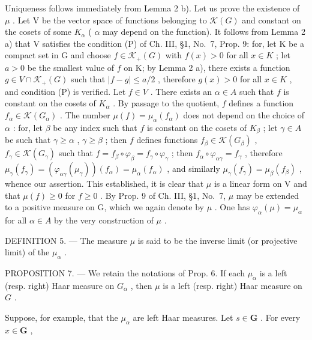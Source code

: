 Uniqueness follows immediately from Lemma 2 b). Let us prove the existence of \(\mu\) . Let V be the vector space of functions belonging to \(\mathcal{K}(G)\) and constant on the cosets of some \(K_{\alpha}\) ( \(\alpha\) may depend on the function). It follows from Lemma 2 a) that V satisfies the condition (P) of Ch. III, §1, No.~7, Prop. 9: for, let K be a compact set in G and choose \(f \in \mathcal{K}_{+}(G)\) with \(f(x) > 0\) for all \(x \in K\) ; let \(a > 0\) be the smallest value of \(f\) on K; by Lemma 2 a), there exists a function \(g \in V \cap \mathcal{K}_{+}(G)\) such that \(|f - g| \leqslant a/2\) , therefore \(g(x) > 0\) for all \(x \in K\) , and condition (P) is verified. Let \(f \in V\) . There exists an \(\alpha \in A\) such that \(f\) is constant on the cosets of \(K_{\alpha}\) . By passage to the quotient, \(f\) defines a function \(f_{\alpha} \in \mathcal{K}(G_{\alpha})\) . The number \(\mu(f) = \mu_{\alpha}(f_{\alpha})\) does not depend on the choice of \(\alpha\) : for, let \(\beta\) be any index such that \(f\) is constant on the cosets of \(K_{\beta}\) ; let \(\gamma \in A\) be such that \(\gamma \geqslant \alpha\) , \(\gamma \geqslant \beta\) ; then \(f\) defines functions \(f_{\beta} \in \mathcal{K}(G_{\beta})\) , \(f_{\gamma} \in \mathcal{K}(G_{\gamma})\) such that \(f = f_{\beta} \circ \varphi_{\beta} = f_{\gamma} \circ \varphi_{\gamma}\) ; then \(f_{\alpha} \circ \varphi_{\alpha\gamma} = f_{\gamma}\) , therefore \(\mu_{\gamma}(f_{\gamma}) = (\varphi_{\alpha\gamma}(\mu_{\gamma}))(f_{\alpha}) = \mu_{\alpha}(f_{\alpha})\) , and similarly \(\mu_{\gamma}(f_{\gamma}) = \mu_{\beta}(f_{\beta})\) , whence our assertion. This established, it is clear that \(\mu\) is a linear form on V and that \(\mu(f) \geqslant 0\) for \(f \geqslant 0\) . By Prop. 9 of Ch. III, §1, No.~7, \(\mu\) may be extended to a positive measure on G, which we again denote by \(\mu\) . One has \(\varphi_{\alpha}(\mu) = \mu_{\alpha}\) for all \(\alpha \in A\) by the very construction of \(\mu\) .

DEFINITION 5. --- The measure \(\mu\) is said to be the inverse limit (or projective limit) of the \(\mu_{\alpha}\) .

PROPOSITION 7. --- We retain the notations of Prop. 6. If each \(\mu_{\alpha}\) is a left (resp. right) Haar measure on \(G_{\alpha}\) , then \(\mu\) is a left (resp. right) Haar measure on \(G\) .

Suppose, for example, that the \(\mu_{\alpha}\) are left Haar measures. Let \(s \in \mathbf{G}\) . For every \(x \in \mathbf{G}\) ,

